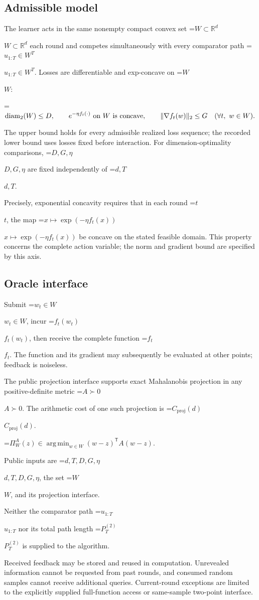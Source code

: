 \documentclass[10pt,a4paper]{article}
\newcommand{\AtlasMath}[1]{\par\begingroup\centering\setbox0=\hbox{$\displaystyle #1$}\ifdim\wd0>1.4\linewidth\typeout{ATLAS WIDE FORMULA: \the\wd0}\fi\ifdim\wd0>\linewidth\resizebox{\linewidth}{!}{\box0}\else\box0\fi\par\endgroup}
\newcommand{\AtlasInlineMath}[1]{\begingroup\setbox0=\hbox{$#1$}\ifdim\wd0>.4\linewidth\endgroup\AtlasMath{#1}\else\endgroup$#1$\fi}
\begin{document}
\subsection{Admissible model}
The learner acts in the same nonempty compact convex set \AtlasInlineMath{W\subset\mathbb{R}^d} each round and competes simultaneously with every comparator path \AtlasInlineMath{u_{1:T}\in W^T}. Losses are differentiable and exp-concave on \AtlasInlineMath{W}:


\AtlasMath{\operatorname{diam}_2(W)\le D,\qquad e^{-\eta f_t(\cdot)}\ \text{\text{on} }W\text{ \text{is concave}},\qquad \|\nabla f_t(w)\|_2\le G\quad(\forall t,\ w\in W).}


The upper bound holds for every admissible realized loss sequence; the recorded lower bound uses losses fixed before interaction. For dimension-optimality comparisons, \AtlasInlineMath{D,G,\eta} are fixed independently of \AtlasInlineMath{d,T}.

Precisely, exponential concavity requires that in each round \AtlasInlineMath{t}, the map \AtlasInlineMath{x\mapsto\exp(-\eta f_t(x))} be concave on the stated feasible domain. This property concerns the complete action variable; the norm and gradient bound are specified by this axis.

\subsection{Oracle interface}
Submit \AtlasInlineMath{w_t\in W}, incur \AtlasInlineMath{f_t(w_t)}, then receive the complete function \AtlasInlineMath{f_t}. The function and its gradient may subsequently be evaluated at other points; feedback is noiseless.

The public projection interface supports exact Mahalanobis projection in any positive-definite metric \AtlasInlineMath{A\succ0}. The arithmetic cost of one such projection is \AtlasInlineMath{C_{\mathrm{proj}}(d)}.


\AtlasMath{\Pi_W^A(z)\in\operatorname*{arg\,min}_{w\in W}(w-z)^{\mathsf T}A(w-z).}


Public inputs are \AtlasInlineMath{d,T,D,G,\eta}, the set \AtlasInlineMath{W}, and its projection interface.

Neither the comparator path \AtlasInlineMath{u_{1:T}} nor its total path length \AtlasInlineMath{P_T^{(2)}} is supplied to the algorithm.

Received feedback may be stored and reused in computation. Unrevealed information cannot be requested from past rounds, and consumed random samples cannot receive additional queries. Current-round exceptions are limited to the explicitly supplied full-function access or same-sample two-point interface.
\end{document}
